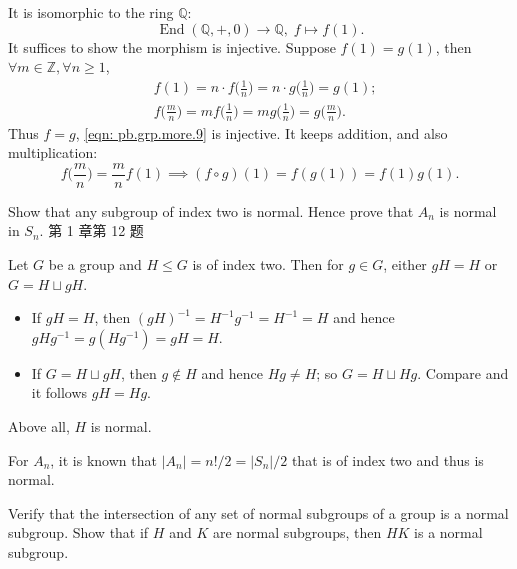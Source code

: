\begin{solution}
    It is isomorphic to the ring $\mathbb{Q}$:
        \begin{equation}
            \label{eqn: pb.grp.more.9}
            \operatorname{End}(\mathbb{Q},+,0) \to \mathbb{Q},\; f\mapsto f(1). 
        \end{equation}
    It suffices to show the morphism is injective.  Suppose $f(1)=g(1)$, then $\forall m\in\mathbb{Z},\forall n\geq1  $, 
        \[
            \begin{split}
                & f(1)=n\cdot f\Big(\frac{1}{n}\Big)=n\cdot g\Big(\frac{1}{n}\Big)=g(1);\\
                & f\Big(\frac{m}{n}\Big)=m f\Big(\frac{1}{n}\Big)=m g\Big(\frac{1}{n}\Big)=g\Big(\frac{m}{n}\Big).
            \end{split}
        \]
    Thus $f=g$, \eqref{eqn: pb.grp.more.9} is injective. 
    It keeps addition, and also multiplication:
        \[
            f\Big(\frac{m}{n}\Big)=\frac{m}{n}f(1)\implies(f\circ g)(1)=f( g(1) )=f(1) g(1).
        \]
\end{solution}

\setcounter{pb}{11}

\begin{problem}
    Show that any subgroup of index two is normal. Hence prove that
    $A_n$ is normal in $S_n$. 第 1 章第 12 题
\end{problem}

\begin{solution}
    Let $G$ be a group and $H\leq G$ is of index two. Then for $g\in G$, either $ g H=H$ or $G=H\sqcup g H$. 
    \begin{itemize}
        \item If $g H=H$, then $(g H)^{-1}=H^{-1} g^{-1}=H^{-1}=H$ and hence $g H g^{-1}=g (H g^{-1})=g H=H$.
        \item If $G=H\sqcup g H$, then $g\notin H$ and hence $H g\neq H$; so $G=H\sqcup H g$. Compare and it follows $g H =H g$.
    \end{itemize}
    Above all, $H$ is normal.
    \par For $A_{n}$, it is known that $|A_{n}|=n!/2=|S_{n}|/2$ that is of index two and thus is normal.
\end{solution}

\begin{problem}
    Verify that the intersection of any set of normal subgroups of a group is a normal subgroup. 
    Show that if $H$ and $K$ are normal subgroups, then $HK$ is a normal subgroup.
\end{problem}


